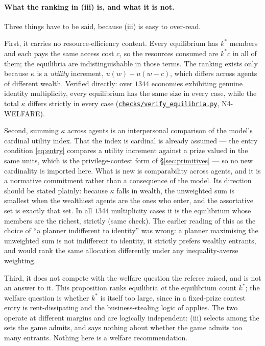 \documentclass[11pt]{article}
\newcommand{\file}[1]{\href{run:#1}{\texttt{#1}}}
\begin{document}
\paragraph{What the ranking in (iii) is, and what it is not.}
Three things have to be said, because (iii) is easy to over-read.

First, it carries no resource-efficiency content. Every equilibrium has
$k^*$ members and each pays the same access cost $c$, so the resources
consumed are $k^*c$ in all of them; the equilibria are indistinguishable in
those terms. The ranking exists only because $\kappa$ is a \emph{utility}
increment, $u(w)-u(w-c)$, which differs across agents of different wealth.
Verified directly: over $1344$ economies exhibiting genuine identity
multiplicity, every equilibrium has the same size in every case, while the
total $\kappa$ differs strictly in every case
(\file{checks/verify\_equilibria.py}, N4-WELFARE).

Second, summing $\kappa$ across agents is an interpersonal comparison of the
model's cardinal utility index. That the index is cardinal is already assumed
--- the entry condition \eqref{eq:entry} compares a utility increment against
a prize valued in the same units, which is the privilege-contest form of
\S\ref{sec:primitives} --- so no new cardinality is imported here. What is
new is comparability across agents, and it is a normative commitment rather
than a consequence of the model. Its direction should be stated plainly:
because $\kappa$ falls in wealth, the unweighted sum is smallest when the
wealthiest agents are the ones who enter, and the assortative set is exactly
that set. In all $1344$ multiplicity cases it is the equilibrium whose
members are the richest, strictly (same check). The earlier reading of this
as the choice of ``a planner indifferent to identity'' was wrong: a planner
maximising the unweighted sum is not indifferent to identity, it strictly
prefers wealthy entrants, and would rank the same allocation differently
under any inequality-averse weighting.

Third, it does not compete with the welfare question the referee raised, and
is not an answer to it. This proposition ranks equilibria \emph{at} the
equilibrium count $k^*$; the welfare question is whether $k^*$ is itself too
large, since in a fixed-prize contest entry is rent-dissipating and the
business-stealing logic of \citet{LevinSmith1994} applies. The two operate at
different margins and are logically independent: (iii) selects among the sets
the game admits, and says nothing about whether the game admits too many
entrants. Nothing here is a welfare recommendation.
\end{document}
